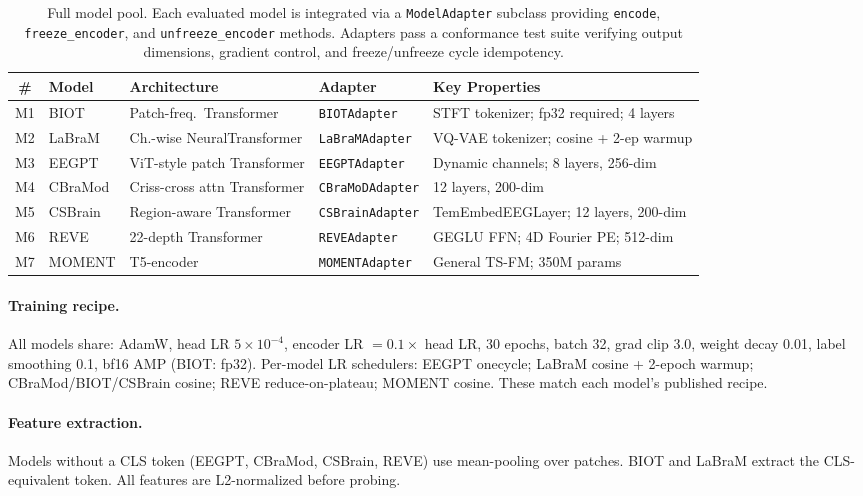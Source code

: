 \documentclass{article}
\begin{document}
\begin{table}[h]
  \caption{Full model pool. Each evaluated model is integrated via a \texttt{ModelAdapter} subclass providing \texttt{encode}, \texttt{freeze\_encoder}, and \texttt{unfreeze\_encoder} methods. Adapters pass a conformance test suite verifying output dimensions, gradient control, and freeze/unfreeze cycle idempotency.}
  \label{tab:models_full}
  \centering
  \small
  \begin{tabular}{clllp{4.2cm}}
    \toprule
    \# & Model & Architecture & Adapter & Key Properties \\
    \midrule
    M1 & BIOT & Patch-freq.\ Transformer & \texttt{BIOTAdapter} & STFT tokenizer; fp32 required; 4 layers \\
    M2 & LaBraM & Ch.-wise NeuralTransformer & \texttt{LaBraMAdapter} & VQ-VAE tokenizer; cosine + 2-ep warmup \\
    M3 & EEGPT & ViT-style patch Transformer & \texttt{EEGPTAdapter} & Dynamic channels; 8 layers, 256-dim \\
    M4 & CBraMod & Criss-cross attn Transformer & \texttt{CBraMoDAdapter} & 12 layers, 200-dim \\
    M5 & CSBrain & Region-aware Transformer & \texttt{CSBrainAdapter} & TemEmbedEEGLayer; 12 layers, 200-dim \\
    M6 & REVE & 22-depth Transformer & \texttt{REVEAdapter} & GEGLU FFN; 4D Fourier PE; 512-dim \\
    M7 & MOMENT & T5-encoder & \texttt{MOMENTAdapter} & General TS-FM; 350M params \\
    \bottomrule
  \end{tabular}
\end{table}

\paragraph{Training recipe.}
All models share: AdamW, head LR $5 \times 10^{-4}$, encoder LR $= 0.1 \times$ head LR, 30 epochs, batch 32, grad clip 3.0, weight decay 0.01, label smoothing 0.1, bf16 AMP (BIOT: fp32). Per-model LR schedulers: EEGPT onecycle; LaBraM cosine + 2-epoch warmup; CBraMod/BIOT/CSBrain cosine; REVE reduce-on-plateau; MOMENT cosine. These match each model's published recipe.

\paragraph{Feature extraction.}
Models without a CLS token (EEGPT, CBraMod, CSBrain, REVE) use mean-pooling over patches. BIOT and LaBraM extract the CLS-equivalent token. All features are L2-normalized before probing.
\end{document}
